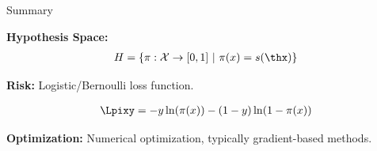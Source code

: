 \documentclass[11pt,compress,t,notes=noshow, xcolor=table]{beamer}
\begin{document}




 





\begin{frame}{Summary}

\textbf{Hypothesis Space:} 
\begin{eqnarray*}
  \Hspace = \left\{\pi: \Xspace \to [0,1] ~|~\pix = s(\thx) \right\}
\end{eqnarray*}

\lz

\textbf{Risk:} Logistic/Bernoulli loss function.

\begin{eqnarray*}
  \Lpixy = -y\ln(\pix)-(1-y)\ln(1-\pix)
\end{eqnarray*}

\lz


\textbf{Optimization:} Numerical optimization, typically gradient-based methods.




\end{frame}

\endlecture
\end{document}
